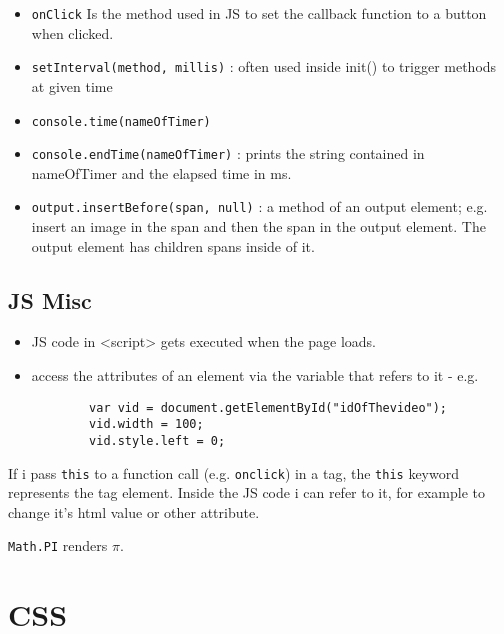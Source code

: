 \documentclass[a4paper,11pt]{book}
\begin{document}
\begin{itemize}
	\item \texttt{onClick}
	Is the method used in JS to set the callback function to a button when clicked.		
	
	\item \texttt{setInterval(method, millis)} : often used inside init() to trigger methods at given time
	\item \texttt{console.time(nameOfTimer)}
	\item \texttt{console.endTime(nameOfTimer)} : prints the string contained in nameOfTimer and the elapsed time in ms.
	
	\item \texttt{output.insertBefore(span, null)} : a method of an output element; e.g. insert
	an image in the span and then the span in the output element. The output element has children
	spans inside of it.

\end{itemize}

\section{JS Misc}
	\begin{itemize}
	\item JS code in <script> gets executed when the page loads.
	\item access the attributes of an element via the variable that
		refers to it - e.g.
		
		\begin{verbatim}
		var vid = document.getElementById("idOfThevideo");
		vid.width = 100;
		vid.style.left = 0;
		\end{verbatim}
	\end{itemize}
	
	If i pass \texttt{this} to a function call (e.g. \texttt{onclick}) in a tag, the \texttt{this}
	keyword represents the tag element. Inside the JS code i can refer to it, for example to change
	it's html value or other attribute.
	
	\texttt{Math.PI} renders $ \pi $.

\chapter{CSS}
\end{document}
